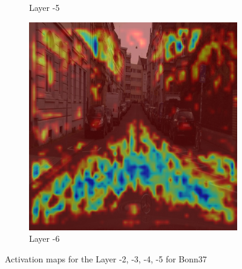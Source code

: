 \begin{figure}
\begin{subfigure}[b]{0.49\textwidth}
        \caption{Layer -5}
        \label{fig:c-5}
    \end{subfigure}
    \hfill
    \begin{subfigure}[b]{0.49\textwidth}
        \centering
        \includegraphics[width=\textwidth]{figures/bonn_000037_000019_leftImg8bit.pnglayer-6/bonn_000037_000019_leftImg8bit.png_object(0)_heatmap}
        \caption{Layer -6}
        \label{fig:c-6}
    \end{subfigure}
    \hfill
    \caption{Activation maps for the Layer -2, -3, -4, -5 for Bonn37}
    \label{fig:Bonn-000037-000019}
\end{figure}


